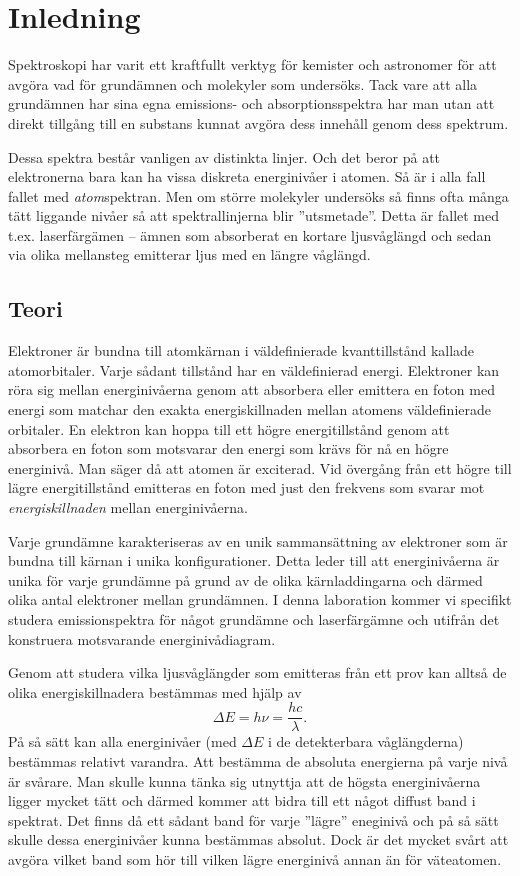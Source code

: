 \documentclass[11pt,a4paper]{article}
\begin{document}





\section{Inledning}
Spektroskopi har varit ett kraftfullt verktyg för kemister och astronomer för att avgöra vad för grundämnen och molekyler som undersöks. Tack vare att alla grundämnen har sina egna emissions- och absorptionsspektra har man utan att direkt tillgång till en substans kunnat avgöra dess innehåll genom dess spektrum. 

Dessa spektra består vanligen av distinkta linjer. Och det beror på att elektronerna bara kan ha vissa diskreta energinivåer i atomen. Så är i alla fall fallet med \emph{atom}spektran. Men om större molekyler undersöks så finns ofta många tätt liggande nivåer så att spektrallinjerna blir ''utsmetade''. Detta är fallet med t.ex. laserfärgämen -- ämnen som absorberat en kortare ljusvåglängd och sedan via olika mellansteg emitterar ljus med en längre våglängd. 


\subsection{Teori}
 Elektroner är bundna till atomkärnan i väldefinierade kvanttillstånd kallade atomorbitaler. Varje sådant tillstånd har en väldefinierad energi. Elektroner kan röra sig mellan energinivåerna genom att absorbera eller emittera en foton med energi som matchar den exakta energiskillnaden mellan atomens väldefinierade orbitaler. En elektron kan hoppa till ett högre energitillstånd genom att absorbera en foton som motsvarar den energi som krävs för nå en högre energinivå. Man säger då att atomen är exciterad. Vid övergång från ett högre till lägre energitillstånd emitteras en foton med just den frekvens som svarar mot \emph{energiskillnaden} mellan energinivåerna.
 
 Varje grundämne karakteriseras av en unik sammansättning av elektroner som är bundna till kärnan i unika konfigurationer. Detta leder till att energinivåerna är unika för varje grundämne på grund av de olika kärnladdingarna och därmed olika antal elektroner mellan grundämnen. I denna laboration kommer vi specifikt studera emissionspektra för något grundämne och laserfärgämne och utifrån det konstruera motsvarande energinivådiagram.
 
 Genom att studera vilka ljusvåglängder som emitteras från ett prov kan alltså de olika energiskillnadera bestämmas med hjälp av
 \[\Delta E = h\nu=\frac{hc}{\lambda}.\]
 På så sätt kan alla energinivåer (med $\Delta E$ i de detekterbara våglängderna) bestämmas relativt varandra. Att bestämma de absoluta energierna på varje nivå är svårare. Man skulle kunna tänka sig utnyttja att de högsta energinivåerna ligger mycket tätt och därmed kommer att bidra till ett något diffust band i spektrat. Det finns då ett sådant band för varje ''lägre'' eneginivå och på så sätt skulle dessa energinivåer kunna bestämmas absolut. Dock är det mycket svårt att avgöra vilket band som hör till vilken lägre energinivå annan än för väteatomen. 
 
\end{document}
